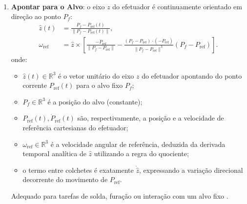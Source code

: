 \begin{enumerate}
    \item \textbf{Apontar para o Alvo}: o eixo $z$ do efetuador é continuamente orientado em direção ao ponto $P_f$:
    \begin{equation}
    \begin{aligned}
        \hat{z}(t) &= \frac{P_f - P_{\text{ref}}(t)}{\|P_f - P_{\text{ref}}(t)\|}, \\
        \omega_{\text{ref}} &= \hat{z} \times \left[\frac{-\dot{P}_{\text{ref}}}{\|P_f - P_{\text{ref}}\|} - \frac{(P_f - P_{\text{ref}}) \cdot (-\dot{P}_{\text{ref}})}{\|P_f - P_{\text{ref}}\|^3}(P_f - P_{\text{ref}})\right].
    \end{aligned}
    \label{eq:orient_point}
    \end{equation}
    onde:
    \begin{itemize}
        \item $\hat{z}(t) \in \mathbb{R}^3$ é o vetor unitário do eixo $z$ do efetuador apontando do ponto corrente $P_{\text{ref}}(t)$ para o alvo fixo $P_f$;
        \item $P_f \in \mathbb{R}^3$ é a posição do alvo (constante);
        \item $P_{\text{ref}}(t), \dot{P}_{\text{ref}}(t)$ são, respectivamente, a posição e a velocidade de referência cartesianas do efetuador;
        \item $\omega_{\text{ref}} \in \mathbb{R}^3$ é a velocidade angular de referência, deduzida da derivada temporal analítica de $\hat{z}$ utilizando a regra do quociente;
        \item o termo entre colchetes é exatamente $\dot{\hat{z}}$, expressando a variação direcional decorrente do movimento de $P_{\text{ref}}$.
    \end{itemize}
    Adequado para tarefas de solda, furação ou interação com um alvo fixo \cite{chiaverini1997singularity}.
    

\end{enumerate}
